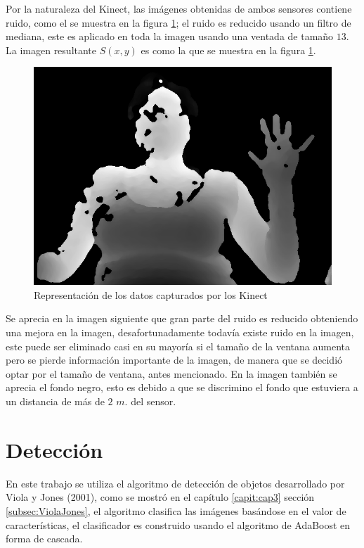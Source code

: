 Por la naturaleza del Kinect, las imágenes obtenidas de ambos sensores contiene ruido, como el se muestra en la figura \ref{fig:ImagenCapturadaNoNoise}; el ruido es reducido usando un filtro de mediana, este es aplicado en toda la imagen usando una ventada de tamaño $13$. La imagen resultante $S(x,y)$ es como la que se muestra en la figura \ref{fig:ImagenCapturadaNoNoise}.\\ 
\begin{figure}[h!]
\begin{center}
\includegraphics[scale=.35]{./Figures/166_W13.png}
\end{center}
\caption{Representación de los datos capturados por los Kinect}
\label{fig:ImagenCapturadaNoNoise}
\end{figure}  
Se aprecia en la imagen siguiente  que gran parte del ruido es reducido obteniendo una mejora en la imagen, desafortunadamente todavía existe ruido en la imagen, este puede ser eliminado casi en su mayoría  si el tamaño de la ventana aumenta pero se pierde información importante de la imagen, de manera que se decidió optar por el tamaño de ventana, antes mencionado. En la imagen también se aprecia el fondo negro, esto es debido a que se discrimino el fondo que estuviera a un distancia de más de $2$ $m.$ del sensor. 



\section{Detección}\label{sec:DeteccionSystem} 

En este trabajo se utiliza el algoritmo de detección de objetos desarrollado por Viola y Jones (2001), como se mostró en el cap\'itulo \ref{capit:cap3} sección \ref{subsec:ViolaJones}, el algoritmo clasifica las imágenes basándose en el valor de características, el clasificador es construido usando el algoritmo de AdaBoost en forma de cascada. 



